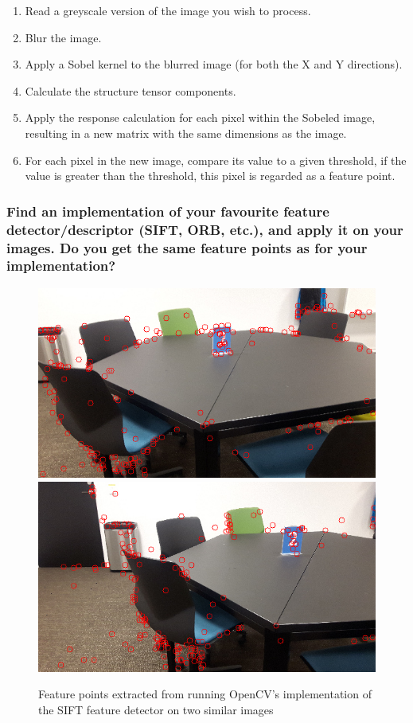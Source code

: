 \documentclass[a4paper, titlepage,12pt]{article}
\begin{document}
	\begin{enumerate}
		\item Read a greyscale version of the image you wish to process.
		\item Blur the image.
		\item Apply a Sobel kernel to the blurred image (for both the X and Y directions).
		\item Calculate the structure tensor components.
		\item Apply the response calculation for each pixel within the Sobeled image, resulting in a new matrix with the same dimensions as the image.
		\item For each pixel in the new image, compare its value to a given threshold, if the value is greater than the threshold, this pixel is regarded as a feature point.
	\end{enumerate}

	\subsubsection*{Find an implementation of your favourite feature detector/descriptor (SIFT, ORB, etc.), and apply it on your images. Do you get the same feature points as for your implementation?}

	\begin{figure}[h!]
		\begin{center}
		\includegraphics[scale=0.3]{./sift_out_1.png}
		\includegraphics[scale=0.3]{./sift_out_2.png}
			\caption{Feature points extracted from running OpenCV's implementation of the SIFT feature detector on two similar images}
		\end{center}
	\end{figure}
\end{document}
